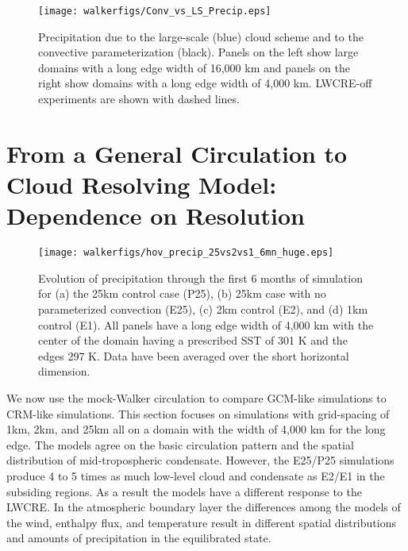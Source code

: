 \documentclass[draft]{agujournal2019}
\begin{document}
{\begin{figure}
  \centering
      \texttt{[image: walkerfigs/Conv\_vs\_LS\_Precip.eps]}
  \caption{Precipitation due to the large-scale (blue) cloud scheme and to the convective 
  parameterization (black).  
  Panels on the left show large domains with a long edge width of 16,000 km and
  panels on the right show domains with a long edge width of 4,000 km.  LWCRE-off experiments are shown with dashed lines.  }
  \label{fig:conv_vs_ls}
\end{figure}



\section{From a General Circulation to Cloud Resolving Model: Dependence on Resolution}

\begin{figure}
  \texttt{[image: walkerfigs/hov\_precip\_25vs2vs1\_6mn\_huge.eps]}
  \caption{Evolution of precipitation through the first 6 months of simulation for (a) the 25km control case (P25), 
  (b) 25km case with no parameterized convection (E25), (c) 2km control (E2), and (d) 1km control (E1).  
  All panels have a long edge width of 4,000 km with the center of the domain having a prescribed SST of 301 K and the edges 297 K.  
  Data have been averaged over the short horizontal dimension.} 
  \label{fig:hov_4mods_6mn}
\end{figure}


We now use the mock-Walker circulation to compare GCM-like simulations to CRM-like simulations.  
This section focuses on simulations with grid-spacing of 1km, 2km, and 25km all on a domain with the width of 4,000 km for the long edge.  
The models agree on the basic circulation pattern and the spatial distribution of mid-tropospheric condensate.  
However, the E25/P25 simulations produce 4 to 5 times as much low-level cloud and 
condensate as E2/E1 in the subsiding regions.   As a result the models have a different response 
to the LWCRE.  In the atmospheric boundary layer the differences among the models of the wind, enthalpy flux, and 
temperature result in different spatial distributions and amounts of precipitation in the equilibrated state.  

}
\end{document}
